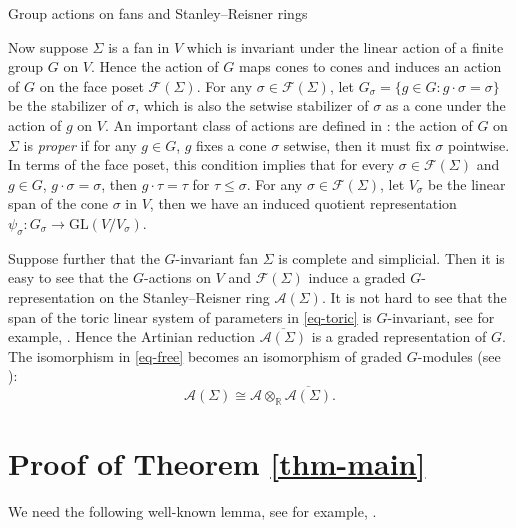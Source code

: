 \documentclass{amsart}
\makeatletter
\def\subsection{\@startsection{subsection}{2}
  \z@{.5\linespacing\@plus.7\linespacing}{.5\linespacing}
  {\normalfont\bfseries}}
\theoremstyle{definition}
\theoremstyle{remark}
\numberwithin{equation}{section}
\makeatother
\begin{document}
\subsection{Group actions on fans and Stanley--Reisner rings}

Now suppose $\Sigma$ is a fan in $V$ which is invariant under the linear action of a finite group $G$ on $V$. Hence the action of $G$ maps cones to cones and induces an action of $G$ on the face poset $\mathcal{F}(\Sigma)$. For any $\sigma \in \mathcal{F}(\Sigma)$, let $G_\sigma=\{g \in G: g \cdot \sigma=\sigma\}$ be the stabilizer of $\sigma$, which is also the setwise stabilizer of $\sigma$ as a cone under the action of $g$ on $V$.  An important class of actions are defined in \cite{stembridge1994some}: the action of $G$ on $\Sigma$ is \emph{proper} if for any $g \in G$, $g$ fixes a cone $\sigma$ setwise, then it must fix $\sigma$ pointwise. In terms of the face poset, this condition implies that for every $\sigma \in \mathcal{F}(\Sigma)$ and $g \in G$, $g\cdot\sigma=\sigma$, then $g\cdot\tau=\tau$ for $\tau\leq\sigma$.
For any $\sigma \in \mathcal{F}(\Sigma)$, let $V_\sigma$ be the linear span of the cone $\sigma$ in $V$, then we have an induced quotient representation $\psi_{\sigma}: G_{\sigma} \rightarrow \mathrm{GL}\left(V/ V_\sigma\right)$. 

Suppose further that the $G$-invariant fan $\Sigma$ is complete and simplicial. Then it is easy to see that the $G$-actions on $V$ and $\mathcal{F}(\Sigma)$ induce a graded $G$-representation on the Stanley--Reisner ring $\mathcal{A}(\Sigma)$. It is not hard to see that the span of the toric linear system of parameters in \eqref{eq-toric} is $G$-invariant, see for example, \cite[p.250]{stembridge1994some}. Hence the Artinian reduction $\overline{\mathcal{A}(\Sigma)}$ is a graded representation of $G$. The isomorphism in \eqref{eq-free} becomes an isomorphism of graded $G$-modules (see \cite[p.251, eq. (2.4)]{stembridge1994some}):
\begin{equation} \label{eq-Giso}
  \mathcal{A}(\Sigma)\cong \mathcal{A}\otimes_{\mathbb{R}}\overline{\mathcal{A}(\Sigma)}.  
\end{equation}

\section{Proof of Theorem \ref{thm-main}} \label{sec-proof}
We need the following well-known lemma, see for example, \cite[Chapter 5, Section 5, No.3, Lemma 2]{Bourbaki-Lie456}.
\end{document}
